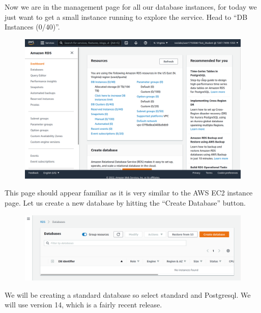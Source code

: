 \documentclass{csse4400}
\begin{document}
Now we are in the management page for all our database instances,
for today we just want to get a small instance running to explore the service.
Head to ``DB Instances (0/40)''.

\begin{figure}[H]
\includegraphics[width=\textwidth]{images/aws_2}
\end{figure}

This page should appear familiar as it is very similar to the AWS EC2 instance page.
Let us create a new database by hitting the ``Create Database'' button.

\begin{figure}[H]
\includegraphics[width=\textwidth]{images/aws_3}
\end{figure}



We will be creating a standard database so select standard and Postgresql.
We will use version 14, which is a fairly recent release.
\end{document}
